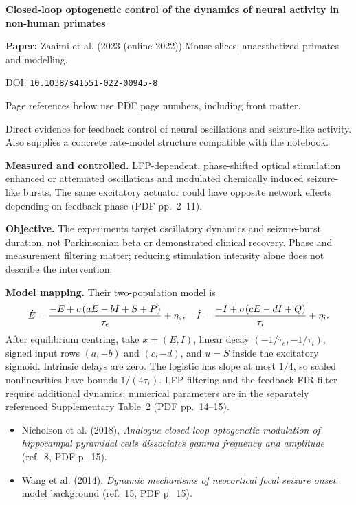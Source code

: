 

{\Large\bfseries Closed-loop optogenetic control of the dynamics of neural activity in non-human primates\par}

\textbf{Paper:} Zaaimi et al. (2023 (online 2022)).\quad Mouse slices, anaesthetized primates and modelling.\par
\href{https://doi.org/10.1038/s41551-022-00945-8}{DOI: \nolinkurl{10.1038/s41551-022-00945-8}}\par
{\footnotesize Page references below use PDF page numbers, including front matter.}

Direct evidence for feedback control of neural oscillations and seizure-like activity. Also supplies a concrete rate-model structure compatible with the notebook.

\textbf{Measured and controlled.} LFP-dependent, phase-shifted optical stimulation enhanced or attenuated oscillations and modulated chemically induced seizure-like bursts. The same excitatory actuator could have opposite network effects depending on feedback phase (PDF pp.~2--11).

\textbf{Objective.} The experiments target oscillatory dynamics and seizure-burst duration, not Parkinsonian beta or demonstrated clinical recovery. Phase and measurement filtering matter; reducing stimulation intensity alone does not describe the intervention.

\textbf{Model mapping.} Their two-population model is
\[
\dot E={-E+\sigma(aE-bI+S+P)\over\tau_e}+\eta_e,
\quad
\dot I={-I+\sigma(cE-dI+Q)\over\tau_i}+\eta_i.
\]
After equilibrium centring, take $x=(E,I)$, linear decay $(-1/\tau_e,-1/\tau_i)$, signed input rows $(a,-b)$ and $(c,-d)$, and $u=S$ inside the excitatory sigmoid. Intrinsic delays are zero. The logistic has slope at most $1/4$, so scaled nonlinearities have bounds $1/(4\tau_i)$. LFP filtering and the feedback FIR filter require additional dynamics; numerical parameters are in the separately referenced Supplementary Table~2 (PDF pp.~14--15).

\begin{itemize}
\item Nicholson et al. (2018), \emph{Analogue closed-loop optogenetic modulation of hippocampal pyramidal cells dissociates gamma frequency and amplitude} (ref.~8, PDF p.~15).
\item Wang et al. (2014), \emph{Dynamic mechanisms of neocortical focal seizure onset}: model background (ref.~15, PDF p.~15).
\end{itemize}


